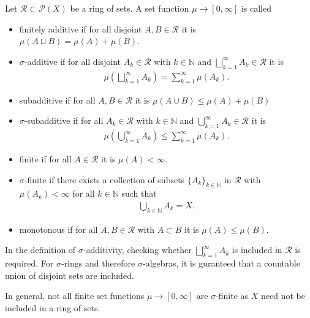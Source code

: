 \begin{definition}
    Let \(\mathcal{R} \subset \mathcal{P}(X)\) be a ring of sets. A set function \(\mu \rightarrow [0, \infty]\) is called
    \begin{itemize}
        \item finitely additive if for all disjoint \(A, B \in \mathcal{R}\) it is \(\mu (A \sqcup B) = \mu(A) + \mu(B)\).
        \item \(\sigma\)-additive if for all disjoint \(A_k \in \mathcal{R}\) with \(k \in \mathbb{N}\) and  \(\bigsqcup_{k=1}^\infty A_k \in \mathcal{R}\) it is
        \begin{align}
            \mu \left( \bigsqcup_{k=1}^\infty A_k \right) = \sum_{k=1}^\infty \mu(A_k) \text{.}
        \end{align}
        \item subadditive if for all \(A, B \in \mathcal{R}\) it is \(\mu(A \cup B) \leq \mu(A) + \mu(B)\)
        \item \(\sigma\)-subadditive if for all \(A_k \in \mathcal{R}\) with \(k \in \mathbb{N}\) and  \(\bigcup_{k=1}^\infty A_k \in \mathcal{R}\) it is
        \begin{align}
            \mu \left( \bigcup_{k=1}^\infty A_k \right) \leq \sum_{k=1}^\infty \mu(A_k) \text{.}
        \end{align}
        \item finite if for all \(A \in \mathcal{R}\) it is \(\mu(A) < \infty\).
        \item \(\sigma\)-finite if there exists a collection of subsets \(\{A_k\}_{k \in \mathbb{N}}\) in \(\mathcal{R}\) with \(\mu(A_k) < \infty\) for all \(k \in \mathbb{N}\) such that
        \begin{align}
            \bigcup_{k \in \mathbb{N}} A_k = X \text{.}
        \end{align}
        \item monotonous if for all \(A, B \in \mathcal{R}\) with \(A \subset B\) it is \(\mu(A) \leq \mu(B)\).
    \end{itemize}
\end{definition}
%
\begin{remark}
    In the definition of \(\sigma\)-additivity, checking whether \( \bigsqcup_{k=1}^\infty A_k\) is included in \(\mathcal{R}\) is required. For \(\sigma\)-rings and therefore \(\sigma\)-algebras, it is guranteed that a countable union of disjoint sets are included.

    In general, not all finite set functions \(\mu \rightarrow [0, \infty]\) are \(\sigma\)-finite as \(X\) need not be included in a ring of sets. 
\end{remark}
